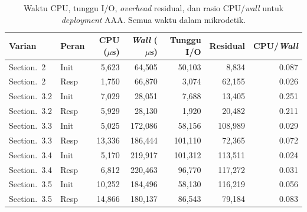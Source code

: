 \documentclass{easychair}
\newcommand{\VarSecShort}[1]{Section.~#1}
\begin{document}
\begin{table}[h]
\centering
\footnotesize
\caption{Waktu CPU, tunggu I/O, \emph{overhead} residual, dan rasio
CPU/\emph{wall} untuk \emph{deployment} AAA. Semua waktu dalam
mikrodetik.}
\label{tab:overhead}
\begin{tabular}{llrrrrr}
\toprule
\textbf{Varian} & \textbf{Peran} & \textbf{CPU ($\mu$s)} & \textbf{\emph{Wall} ($\mu$s)} & \textbf{Tunggu I/O} & \textbf{Residual} & \textbf{CPU/\emph{Wall}} \\
\midrule
\VarSecShort{2}   & Init &  5{,}623 &  64{,}505 &  50{,}103 &   8{,}834 & 0.087 \\
\VarSecShort{2}   & Resp &  1{,}750 &  66{,}870 &   3{,}074 &  62{,}155 & 0.026 \\
\VarSecShort{3.2} & Init &  7{,}029 &  28{,}051 &   7{,}688 &  13{,}405 & 0.251 \\
\VarSecShort{3.2} & Resp &  5{,}929 &  28{,}130 &   1{,}920 &  20{,}482 & 0.211 \\
\VarSecShort{3.3} & Init &  5{,}025 & 172{,}086 &  58{,}156 & 108{,}989 & 0.029 \\
\VarSecShort{3.3} & Resp & 13{,}336 & 186{,}444 & 101{,}110 &  72{,}365 & 0.072 \\
\VarSecShort{3.4} & Init &  5{,}170 & 219{,}917 & 101{,}312 & 113{,}511 & 0.024 \\
\VarSecShort{3.4} & Resp &  6{,}812 & 220{,}463 &  96{,}770 & 117{,}272 & 0.031 \\
\VarSecShort{3.5} & Init & 10{,}252 & 184{,}496 &  58{,}130 & 116{,}219 & 0.056 \\
\VarSecShort{3.5} & Resp & 14{,}866 & 180{,}137 &  86{,}543 &  79{,}184 & 0.083 \\
\bottomrule
\end{tabular}
\end{table}
\end{document}
